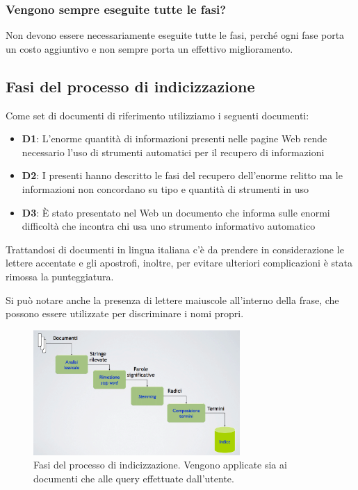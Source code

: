 


\subsubsection{Vengono sempre eseguite tutte le fasi?}

Non devono essere necessariamente eseguite tutte le fasi, perché ogni fase porta un costo aggiuntivo e non sempre porta un effettivo miglioramento.

\subsection{Fasi del processo di indicizzazione}

Come set di documenti di riferimento utilizziamo i seguenti documenti:

\begin{itemize}
	\item \textbf{D1}: L’enorme quantità di informazioni presenti nelle pagine Web rende necessario l’uso di strumenti automatici per il recupero di informazioni
	\item \textbf{D2}: I presenti hanno descritto le fasi del recupero dell’enorme relitto ma le informazioni non concordano su tipo e quantità di strumenti in uso
	\item \textbf{D3}: \`E stato presentato nel Web un documento che informa sulle enormi difficoltà che incontra chi usa uno strumento informativo automatico
\end{itemize}

Trattandosi di documenti in lingua italiana c'è da prendere in considerazione le lettere accentate e gli apostrofi, inoltre, per evitare ulteriori complicazioni è stata rimossa la punteggiatura.

Si può notare anche la presenza di lettere maiuscole all'interno della frase, che possono essere utilizzate per discriminare i nomi propri.

\begin{figure}[htbp]
\centering
\includegraphics[width=0.7\textwidth]{images/l4-fasi}
\caption{Fasi del processo di indicizzazione. Vengono applicate sia ai documenti che alle query effettuate dall'utente.}
\end{figure}

